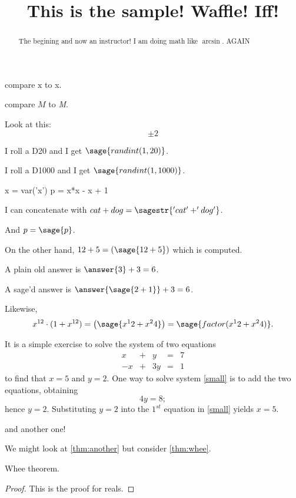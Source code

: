 \documentclass{ximera}
\title[Breal-grond]{This is the sample! Waffle!  Iff!}
\makeatletter
\newcommand{\makerandom}{}
\newcommand{\makerandom}{%
  \ST@wsf{jobname="\currfilebase"}%
  \ST@wsf{import hashlib}%
  \ST@wsf{set_random_seed(int(hashlib.sha256(jobname.encode('utf-8')).hexdigest(), 16))}%
}
\makeatother
\begin{document}
\begin{abstract}
  The begining and now an instructor! I am doing math like $\arcsin$. AGAIN
\end{abstract}

\maketitle
\makerandom

compare $\mathrm{x}$ to x.

compare $M$ to \textit{M}.

Look at this:
\[
  \pm 2
\]

I roll a D20 and I get $\sage{randint(1,20)}$.

I roll a D1000 and I get $\sage{randint(1,1000)}$.


\begin{sagesilent}
x = var('x')
p = x*x - x + 1
\end{sagesilent}

I can concatenate with $cat + dog = \sagestr{'cat' + 'dog'}$.

And $p = \sage{p}$.

On the other hand, $12 + 5 = \left( \sage{12+5} \right)$ which is computed.

\begin{problem}
  A plain old answer is $\answer{3} + 3 = 6$.

  A sage'd answer is $\answer{\sage{2+1}} + 3 = 6$.
\end{problem}

Likewise,
\[
  x^{12} \cdot (1 + x^{12}) = \left(\sage{x^12 + x^24}\right) = \sage{factor(x^12 + x^24)}.
\]

It is a simple exercise to solve the system of two equations
\begin{equation} \label{small}
\begin{array}{rcrcr}
 x & + & y & = & 7 \\
-x & + & 3y & = & 1
\end{array}
\end{equation}
to find that $x=5$ and $y=2$.  One way to solve
system \eqref{small} is to add the two equations, obtaining
\[
4y=8;
\]
hence $y=2$.  Substituting $y=2$ into the $1^{st}$ equation in
\ref{small} yields $x=5$.





and another one!



We might look at \ref{thm:another} but consider \ref{thm:whee}.

\begin{theorem}
  \label{thm:whee}  Whee theorem.
\end{theorem}
\begin{proof}
This is the proof for reals.
\end{proof}
\end{document}
